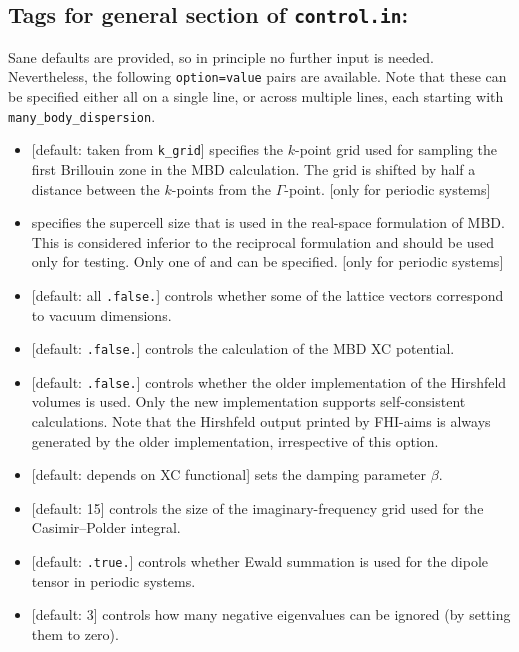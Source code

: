 \subsection*{Tags for general section of \texttt{control.in}:}

Sane defaults are provided, so in principle no further input is
needed. Nevertheless, the following \texttt{option=value} pairs are
available. Note that these can be specified either all on a single line,
or across multiple lines, each starting with \texttt{many\_body\_dispersion}.
 
\begin{itemize}
  \item {} [default: taken from
    \texttt{k\_grid}] specifies the $k$-point grid used for sampling
  the first Brillouin zone in the MBD calculation. The grid is shifted
  by half a distance between the $k$-points from the
  $\Gamma$-point. [only for periodic systems] 
  \item {} specifies the supercell size that
  is used in the real-space formulation of MBD\@. This is considered
  inferior to the reciprocal formulation and should be used only for
  testing. Only one of  and  can be
  specified. [only for periodic systems] 
  \item {} [default: all \texttt{.false.}] controls
  whether some of the lattice vectors correspond to vacuum
  dimensions. 
  \item {} [default: \texttt{.false.}]
  controls the calculation of the MBD XC potential. 
  \item {} [default: \texttt{.false.}]
  controls whether the older implementation of the Hirshfeld volumes
  is used. Only the new implementation supports self-consistent
  calculations. Note that the Hirshfeld output printed by FHI-aims is
  always generated by the older implementation, irrespective of this
  option. 
  \item {} [default: depends on XC functional] sets the
  damping parameter $\beta$. 
  \item {} [default: 15] controls the size of
  the imaginary-frequency grid used for the Casimir--Polder integral. 
  \item {} [default: \texttt{.true.}] controls whether
  Ewald summation is used for the dipole tensor in periodic systems. 
  \item {} [default: 3]
  controls how many negative eigenvalues can be ignored (by setting them to zero).
\end{itemize}

